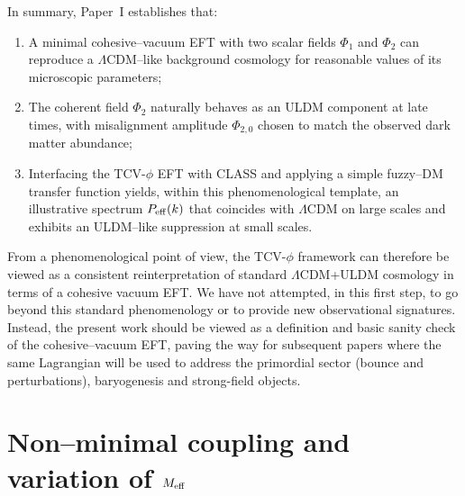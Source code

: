 \documentclass[aps,prd,onecolumn,nofootinbib,superscriptaddress]{revtex4-2}
\begin{document}
\medskip

In summary, Paper~I establishes that:
\begin{enumerate}[label=(\roman*),leftmargin=1.5em]
  \item A minimal cohesive--vacuum EFT with two scalar fields $\Phi_1$ and $\Phi_2$ can reproduce a $\Lambda$CDM--like background cosmology for reasonable values of its microscopic parameters;
  \item The coherent field $\Phi_2$ naturally behaves as an ULDM component at late times, with misalignment amplitude $\Phi_{2,0}$ chosen to match the observed dark matter abundance;
  \item Interfacing the TCV-$\phi$ EFT with CLASS and applying a simple fuzzy--DM transfer function yields, within this phenomenological template, an illustrative spectrum $P_{\rm eff}(k)$ that coincides with $\Lambda$CDM on large scales and exhibits an ULDM--like suppression at small scales.
\end{enumerate}
From a phenomenological point of view, the TCV-$\phi$ framework can therefore be viewed as a consistent reinterpretation of standard $\Lambda$CDM+ULDM cosmology in terms of a cohesive vacuum EFT.
We have not attempted, in this first step, to go beyond this standard phenomenology or to provide new observational signatures. Instead, the present work should be viewed as a definition and basic sanity check of the cohesive--vacuum EFT, paving the way for subsequent papers where the same Lagrangian will be used to address the primordial sector (bounce and perturbations), baryogenesis and strong-field objects.

\appendix

\section{Non--minimal coupling and variation of $M_{\rm eff}$}
\label{app:Meff}
\end{document}
